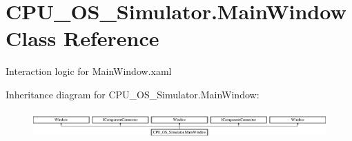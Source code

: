 \hypertarget{class_c_p_u___o_s___simulator_1_1_main_window}{}\section{C\+P\+U\+\_\+\+O\+S\+\_\+\+Simulator.\+Main\+Window Class Reference}
\label{class_c_p_u___o_s___simulator_1_1_main_window}


Interaction logic for Main\+Window.\+xaml  


Inheritance diagram for C\+P\+U\+\_\+\+O\+S\+\_\+\+Simulator.\+Main\+Window\+:\begin{figure}[H]
\begin{center}
\leavevmode
\includegraphics[height=1.092683cm]{class_c_p_u___o_s___simulator_1_1_main_window}
\end{center}
\end{figure}

